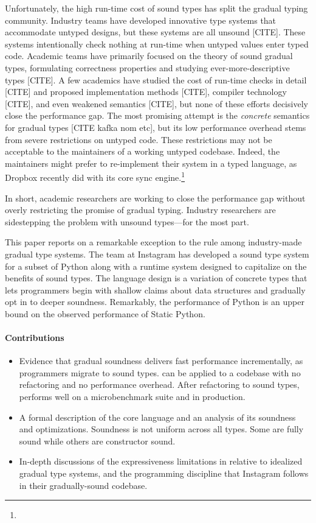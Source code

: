 \documentclass[a4paper,english,cleveref,autoref,thm-restate,anonymous,]{lipics-v2021}
\begin{document}
Unfortunately, the high run-time cost of sound types has split
the gradual typing community.
Industry teams have developed innovative type systems that accommodate
untyped designs, but these systems are all unsound [CITE].
These systems intentionally check nothing at run-time when untyped values enter
typed code.
Academic teams have primarily focused on the theory of sound
gradual types, formulating correctness properties and studying ever-more-descriptive types [CITE].
A few academics have studied the cost of run-time checks
in detail [CITE] and proposed implementation methods [CITE],
compiler technology [CITE],
and even weakened semantics [CITE], but none of these efforts
decisively close the performance gap.
The most promising attempt is the \emph{concrete} semantics
for gradual types [CITE kafka nom etc], but its low performance
overhead stems from severe restrictions on untyped code.
These restrictions may not be acceptable to the maintainers of a
working untyped codebase.
Indeed, the maintainers might prefer to re-implement their system
in a typed language, as Dropbox recently did with its core sync
engine.\footnote{}

In short, academic researchers are working to close the performance gap
without overly restricting the promise of gradual typing.
Industry researchers are sidestepping the problem with unsound types---for the most part.

This paper reports on a remarkable exception to the rule among industry-made gradual type systems.
The \SP{} team at Instagram has developed a sound type system for a subset of
Python along with a runtime system designed to
capitalize on the benefits of sound types.
The language design is a variation of concrete types that lets programmers
begin with shallow claims about data structures and gradually opt in to deeper soundness.
Remarkably, the performance of Python is an upper bound on the observed performance of
Static Python.


\paragraph*{Contributions}

\begin{itemize}
  \item
    Evidence that gradual soundness delivers fast performance incrementally,
    as programmers migrate to sound types.
    \SP{} can be applied to a codebase with no refactoring and no performance overhead.
    After refactoring to sound types, \SP{} performs well on a microbenchmark
    suite and in production.
  \item
    A formal description of the \SP{} core language and an analysis of its soundness
    and optimizations.
    Soundness is not uniform across all types.
    Some are fully sound while others are constructor sound.
  \item
    In-depth discussions of the expressiveness limitations in \SP{} relative to
    idealized gradual type systems, and the programming discipline that Instagram
    follows in their gradually-sound codebase.
\end{itemize}
\end{document}
